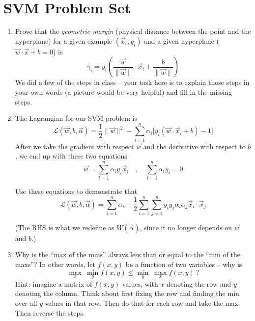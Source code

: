 \documentclass[12pt,letterpaper]{article}
\begin{document}

\section*{SVM Problem Set}

\begin{enumerate}

\item Prove that the {\em geometric margin} (physical distance between the point and the hyperplane) for a given example $(\vec{x}_i, y_i)$ and a given hyperplane ($\vec{w} \cdot \vec{x} + b = 0$) is
\[ \gamma_i = y_i \left(\frac{\vec{w}}{\|\vec{w}\|} \cdot \vec{x}_i + \frac{b}{\|\vec{w}\|}\right) \]
We did a few of the steps in class -- your task here is to explain those steps in your own words (a picture would be very helpful) and fill in the missing steps. 

\vspace{3mm}


\item The Lagrangian for our SVM problem is
\[ \mathcal{L}(\vec{w}, b, \vec{\alpha}) = \frac{1}{2} \| \vec{w} \|^2 - \sum_{i=1}^n \alpha_i \big[y_i (\vec{w}\cdot \vec{x}_i + b) - 1\big] \]
After we take the gradient with respect $\vec{w}$ and the derivative with respect to $b$, we end up with these two equations
\[ \vec{w} = \sum_{i=1}^n \alpha_i y_i \vec{x}_i \quad , \quad \sum_{i=1}^n \alpha_i y_i = 0 \]

Use these equations to demonstrate that
\[ \mathcal{L}(\vec{w}, b, \vec{\alpha}) = \sum_{i=1}^n \alpha_i - \frac{1}{2} \sum_{i=1}^n \sum_{j=1}^n y_i y_j \alpha_i \alpha_j \vec{x}_i \cdot \vec{x}_j  \]

(The RHS is what we redefine as $W(\vec{\alpha})$, since it no longer depends on $\vec{w}$ and $b$.)

\vspace{3mm}

\item Why is the ``max of the mins'' always less than or equal to the ``min of the maxs''?  In other words, let $f(x,y)$ be a function of two variables -- why is
\[ \max_x \ \min_y f(x,y) \leq \min_y \ \max_x f(x,y) \ ?\]
Hint: imagine a matrix of $f(x,y)$ values, with $x$ denoting the row and $y$ denoting the column.  Think about first fixing the row and finding the min over all $y$ values in that row.  Then do that for each row and take the max.  Then reverse the steps.


\end{enumerate}
\end{document}
